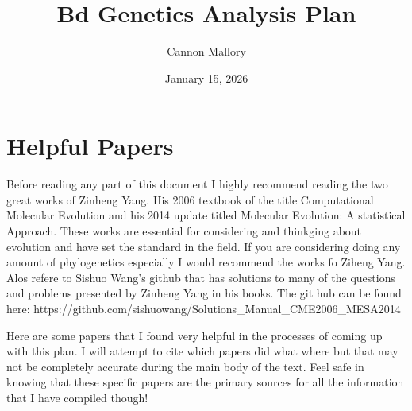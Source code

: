 \documentclass{article}
\title{Bd Genetics Analysis Plan}
\author{Cannon Mallory}
\date{January 15, 2026}
\begin{document}
    \maketitle
    \newpage
    \tableofcontents
    \newpage
    \section{Helpful Papers}
    
    Before reading any part of this document I highly recommend reading the two great works of Zinheng Yang.   His 2006 textbook of the title Computational Molecular Evolution and his 2014 update titled Molecular Evolution: A statistical Approach.   These works are essential for considering and thinkging about evolution and have set the standard in the field.    If you are considering doing any amount of phylogenetics especially I would recommend the works fo Ziheng Yang.   Alos refere to Sishuo Wang's github that has solutions to many of the questions and problems presented by Zinheng Yang in his books.   The git hub can be found here: https://github.com/sishuowang/Solutions_Manual_CME2006_MESA2014
    
    
    Here are some papers that I found very helpful in the processes of coming up with this plan.  I will attempt to cite which papers did what where but that may not be completely accurate during the main body of the text.   Feel safe in knowing that these specific papers are the primary sources for all the information that I have compiled though!


        
\end{document}
